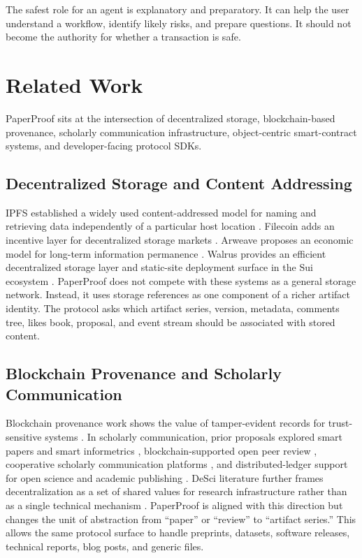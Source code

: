 \documentclass[journal]{IEEEtran}
\begin{document}
The safest role for an agent is explanatory and preparatory. It can help the user understand a workflow, identify likely risks, and prepare questions. It should not become the authority for whether a transaction is safe.

\section{Related Work}

PaperProof sits at the intersection of decentralized storage, blockchain-based provenance, scholarly communication infrastructure, object-centric smart-contract systems, and developer-facing protocol SDKs.

\subsection{Decentralized Storage and Content Addressing}

IPFS established a widely used content-addressed model for naming and retrieving data independently of a particular host location \cite{benet2014ipfs}. Filecoin adds an incentive layer for decentralized storage markets \cite{protocol_labs2017filecoin}. Arweave proposes an economic model for long-term information permanence \cite{williams2023arweave}. Walrus provides an efficient decentralized storage layer and static-site deployment surface in the Sui ecosystem \cite{danezis2025walrus,walrus_docs}. PaperProof does not compete with these systems as a general storage network. Instead, it uses storage references as one component of a richer artifact identity. The protocol asks which artifact series, version, metadata, comments tree, likes book, proposal, and event stream should be associated with stored content.

\subsection{Blockchain Provenance and Scholarly Communication}

Blockchain provenance work shows the value of tamper-evident records for trust-sensitive systems \cite{xu2019blockchain}. In scholarly communication, prior proposals explored smart papers and smart informetrics \cite{hoffman2019scholarly}, blockchain-supported open peer review \cite{tenorio2021decentralizing}, cooperative scholarly communication platforms \cite{stojmenova2019publish}, and distributed-ledger support for open science and academic publishing \cite{janowicz2018prospects}. DeSci literature further frames decentralization as a set of shared values for research infrastructure rather than as a single technical mechanism \cite{weidener2024desci,hoffman2020decentralization}. PaperProof is aligned with this direction but changes the unit of abstraction from ``paper'' or ``review'' to ``artifact series.'' This allows the same protocol surface to handle preprints, datasets, software releases, technical reports, blog posts, and generic files.
\end{document}
